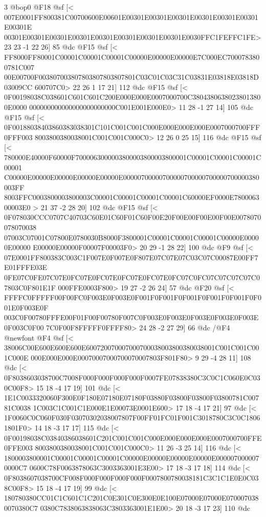 {{{{{{{3 @bop0
@F18 @sf
[<
007E0001FF800381C00700600E00601E00301E00301E00301E00301E00301E00301E00301E
00301E00301E00301E00301E00301E00301E00301E00301E0030FFC1FEFFC1FE>
	 23 23 -1 22 26] 85 @dc
@F15 @sf
[<
FF8000FF80001C00001C00001C00001C00000E00000E00000E7C000EC7000783800781C007
00E00700F003807003807803807803807801C03C01C03C31C03831E03818E03818D03009CC
600707C0>
	 22 26 1 17 21] 112 @dc
@F15 @sf
[<
0F00198038C038601C601C601C200E000E000E0007000700C38043806380238013800E0000
000000000000000000000000C001E001E000E0>
	 11 28 -1 27 14] 105 @dc
@F15 @sf
[<
0F00188038403860383038301C101C001C001C000E000E000E000E0007000700FFF0FFF003
8003800380038001C001C001C000C0>
	 12 26 0 25 15] 116 @dc
@F15 @sf
[<
780000E40000F60000F7000063000003800003800003800001C00001C00001C00001C00001
C00000E00000E00000E00000E00000E00000700000700000700000700000700000380003FF
8003FFC0003800003800003C00001C00001C00001C00001C60000EF0000E780006300003E0
>
	 21 37 -2 28 20] 102 @dc
@F15 @sf
[<
0F078030CCC0707C40703C60E01C60F01C60F00E20F00E00F00E00F00E0078070078070038
07003C07001C07800E0780030B8000F3800001C00001C00001C00001C00000E00000E00000
E00000E00000F00007F00003F0>
	 20 29 -1 28 22] 100 @dc
@F9 @sf
[<
07E0001FF800383C003C1F007E0F007E0F807E07C07E07C03C07C00087E00FF7E01FFFE03E
0FE07C0FE07C07E0FC07E0FC07E0FC07E0FC07E0FC07C0FC07C07C07C07C07803C0F801E1F
000FFE0003F800>
	 19 27 -2 26 24] 57 @dc
@F20 @sf
[<
FFFFC0FFFFF00F00FC0F003E0F003E0F001F0F001F0F001F0F001F0F001F0F001E0F003E0F
003C0F00780FFFE00F01F00F00780F007C0F003E0F003E0F003E0F003E0F003E0F003C0F00
7C0F00F8FFFFF0FFFF80>
	 24 28 -2 27 29] 66 @dc
/@F4 @newfont
@F4 @sf
[<
38006C00E600E600E600E600720070007000700038003800380038001C001C001C001C000E
000E000E000E00070007000700070007803F801F80>
	 9 29 -4 28 11] 108 @dc
[<
0F8038603038700C7008F000F000F000F000F0007FE07838380C3C0C1C060E0C030C00F8>
	 15 18 -4 17 19] 101 @dc
[<
1E1C0033320060F300E0F180E07180E07180F03880F03800F03800F03800781C00781C0038
1C003C1C001C1E000E1E00073E0001E600>
	 17 18 -4 17 21] 97 @dc
[<
1F0060C0C060F030F03070302038007807F00FF01FC01F001C3018780C3C0C18061801F0>
	 14 18 -3 17 17] 115 @dc
[<
0F00198038C03840386038601C201C001C001C000E000E000E000E0007000700FFE0FFE003
8003800380038001C001C001C000C0>
	 11 26 -3 25 14] 116 @dc
[<
1800003800001C00001C00001C00001C00000E00000E00000E00000E0000070000070000C7
0600C78F0063878063C3003363001E3E00>
	 17 18 -3 17 18] 114 @dc
[<
0F8038607038700CF008F000F000F000F000F0007800780038181C3C1C1E0E0C038C00F8>
	 15 18 -4 17 19] 99 @dc
[<
180780380CC01C1C601C1C201C0E301C0E300E0E100E07000E07000E0700070380070380C7
0380C7838063838063C3803363001E1E00>
	 20 18 -3 17 23] 110 @dc
}}}}}}}
